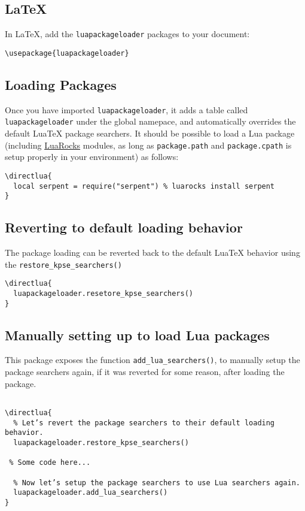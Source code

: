 \documentclass[a4paper]{article}
\begin{document}
\begin{verbatim}

\end{verbatim}

\subsection{\LaTeX}

In \LaTeX, add the \texttt{luapackageloader} packages to your document:

\begin{verbatim}
\usepackage{luapackageloader}
\end{verbatim}

\subsection{Loading Packages}

Once you have imported \texttt{luapackageloader}, it adds a table called
\texttt{luapackageloader} under the global namepace, and automatically
overrides the default LuaTeX package searchers. It should be possible to load a
Lua package (including \href{https://luarocks.org/}{LuaRocks} modules, as long
as \texttt{package.path} and \texttt{package.cpath} is setup properly in your
environment) as follows:

\begin{verbatim}
\directlua{
  local serpent = require("serpent") % luarocks install serpent
}
\end{verbatim}

\subsection{Reverting to default loading behavior}

The package loading can be reverted back to the default LuaTeX behavior using the \texttt{restore\_kpse\_searchers()}
\begin{verbatim}
\directlua{
  luapackageloader.resetore_kpse_searchers()
}
\end{verbatim}

\subsection{Manually setting up to load Lua packages}

This package exposes the function \texttt{add\_lua\_searchers()}, to manually setup the package searchers again, if it was reverted for some reason, after loading the package.

\begin{verbatim}

\directlua{
  % Let’s revert the package searchers to their default loading behavior.
  luapackageloader.restore_kpse_searchers()

 % Some code here...

  % Now let’s setup the package searchers to use Lua searchers again.
  luapackageloader.add_lua_searchers()
}
\end{verbatim}
\end{document}

